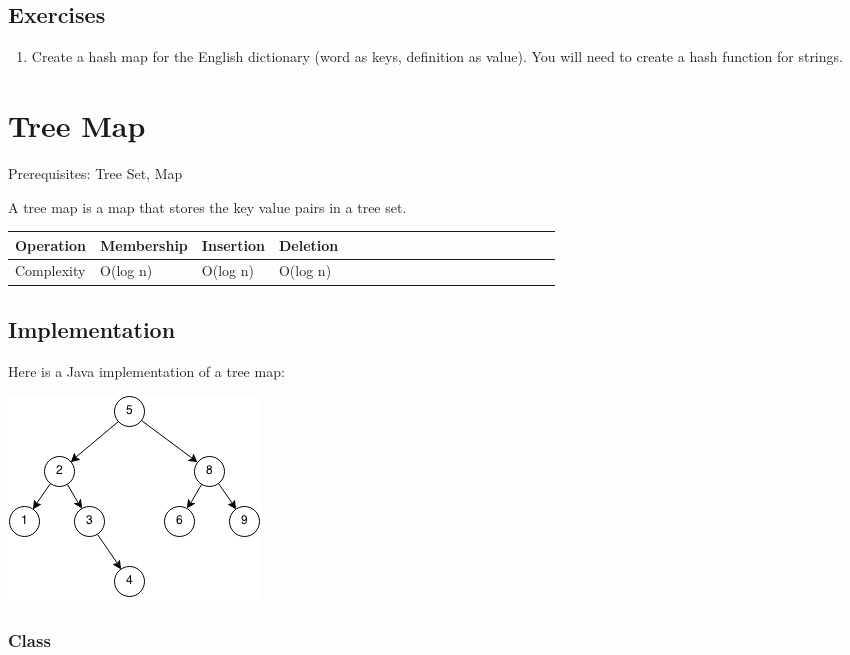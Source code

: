 \documentclass[11pt,oneside]{book}
\makeatletter
\def\maxwidth#1{\ifdim\Gin@nat@width>#1 #1\else\Gin@nat@width\fi}
\makeatother
\begin{document}
\subsection{Exercises}

\begin{enumerate}
\item Create a hash map for the English dictionary (word as keys, definition as value). You will need to create a hash function for strings.
\end{enumerate}

        \section{ Tree Map }
        

Prerequisites: Tree Set, Map

A tree map is a map that stores the key value pairs in a tree set.

\vspace{10pt} \begin{tabulary}{0.4\linewidth}{|l|l|l|l|l|l|l|l|l|l|l|l|l|l|l|l|l|l|l}\hline


  Operation &
  Membership &
  Insertion &
  Deletion\\
\hline


  Complexity &
  O(log n) &
  O(log n) &
  O(log n)\\

\hline\end{tabulary}

\subsection{Implementation}

Here is a Java implementation of a tree map:

\includegraphics[width=\maxwidth{\textwidth}]{bst.png}

\subsubsection{Class}
\end{document}
